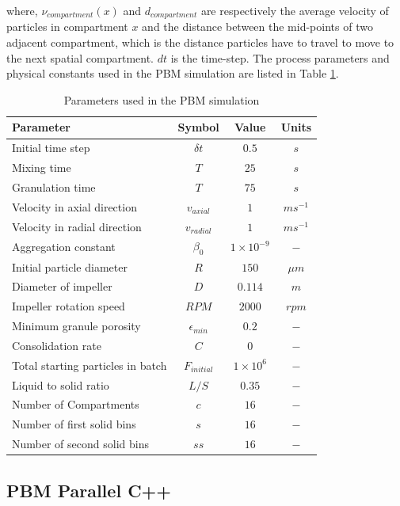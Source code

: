 \documentclass[preprint,11pt,authoryear]{elsarticle}
\begin{document}
where, $\nu_{compartment}(x)$ and $d_{compartment}$ are respectively the average velocity of 
particles in compartment $x$ and the distance between the mid-points of two adjacent compartment, 
which is the distance particles have to travel to move to the next spatial compartment. $dt$ is the 
time-step.
The process parameters and physical constants used in the PBM simulation are listed in Table 
\ref{table:mthds_pbm_parameters}.
\begin{table}[H]
\caption{Parameters used in the PBM simulation}
\label{table:mthds_pbm_parameters}
\begin{center}
\begin{tabular}{l|c|c|c}
\hline
\bf{Parameter} &\bf{Symbol} &\bf{Value} &\bf{Units}\\
\hline
Initial time step & $\delta t$ & $0.5$ & $s$\\
Mixing time & $T$ & $25$ & $s$\\
Granulation time & $T$ & $75$ & $s$\\
Velocity in axial direction & $v_{axial}$ & $1$ & $ms^{-1}$\\
Velocity in radial direction & $v_{radial}$ & $1$ & $ms^{-1}$\\
Aggregation constant & $\beta_0$ & $1\times10^{-9}$ & $-$\\
Initial particle diameter & $R$ & $150$ & $\mu m$\\
Diameter of impeller & $D$ & $0.114$ & $m$ \\
Impeller rotation speed & $RPM$ & $2000$ & $rpm$\\
Minimum granule porosity & $\epsilon_{min}$ & $0.2$ & $-$\\
Consolidation rate & $C$ & $0$ & $-$\\
Total starting particles in batch & $F_{initial}$ & $1 \times 10^{6}$ & $-$\\
Liquid to solid ratio & $L/S$ & $0.35$ & $-$ \\
Number of Compartments & $c$ & $16$ & $-$ \\
Number of first solid bins & $s$ & $16$ & $-$\\
Number of second solid bins & $ss$ & $16$ & $-$\\
\hline
\end{tabular}
\end{center}
\end{table}


\subsection{PBM Parallel C++}
\end{document}
